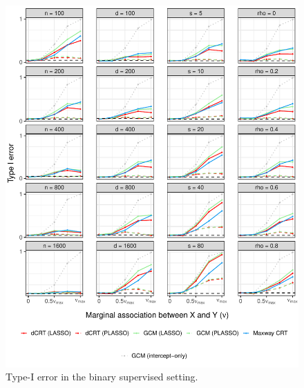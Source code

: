 \documentclass[aos]{imsart}
\theoremstyle{definition}
\theoremstyle{remark}
\begin{document}
\begin{figure}[!ht]
	\centering
	\includegraphics[width = \textwidth]{figures/binomial_supervised_setting_null.pdf}
	\caption{Type-I error in the binary supervised setting.}
	\label{fig:binomial_supervised_null}
\end{figure}
\end{document}
